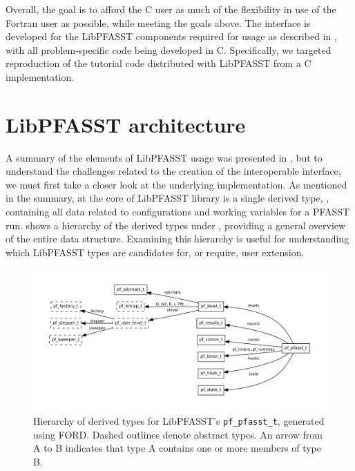 Overall, the goal is to afford the C user as much of the flexibility in use of the Fortran user as possible, while meeting the goals above. The interface is developed for the LibPFASST components required for usage as described in , with all problem-specific code being developed in C. Specifically, we targeted reproduction of the tutorial code distributed with LibPFASST from a C implementation.

\section{LibPFASST architecture} \label{sec:libpfasst_arch}

A summary of the elements of LibPFASST usage was presented in , but to understand the challenges related to the creation of the interoperable interface, we must first take a closer look at the underlying implementation. As mentioned in the summary, at the core of LibPFASST library is a single derived type, , containing all data related to configurations and working variables for a PFASST run.  shows a hierarchy of the derived types under , providing a general overview of the entire data structure. Examining this hierarchy is useful for understanding which LibPFASST types are candidates for, or require, user extension. 

\begin{figure}[ht]
  \centering
  \includegraphics[width=\textwidth]{images/pf_pfasst_t.pdf}
  \caption{Hierarchy of derived types for LibPFASST's \protect\texttt{pf\_pfasst\_t}, generated using FORD\protect\footnotemark. Dashed outlines denote abstract types. An arrow from A to B indicates that type A contains one or more members of type B.}
  \label{fig:libpfasst_types}
\end{figure}

